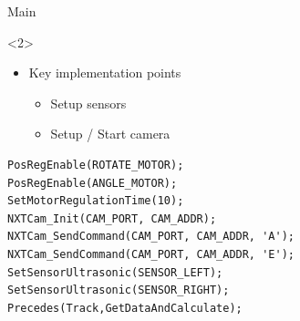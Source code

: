 \begin{frame}[fragile]{Main}
\begin{onlyenv}<2>
\begin{itemize}
  \item Key implementation points
  	\begin{itemize}
  		\item Setup sensors
  		\item Setup / Start camera
	\end{itemize}
\end{itemize}
\begin{center}
\begin{minipage}[H]{0.9\linewidth}
\begin{lstlisting}
PosRegEnable(ROTATE_MOTOR);
PosRegEnable(ANGLE_MOTOR);
SetMotorRegulationTime(10);
NXTCam_Init(CAM_PORT, CAM_ADDR);
NXTCam_SendCommand(CAM_PORT, CAM_ADDR, 'A'); 
NXTCam_SendCommand(CAM_PORT, CAM_ADDR, 'E');
SetSensorUltrasonic(SENSOR_LEFT);
SetSensorUltrasonic(SENSOR_RIGHT);
Precedes(Track,GetDataAndCalculate);
\end{lstlisting} 
\end{minipage}
\end{center}
\end{onlyenv}
\end{frame}

